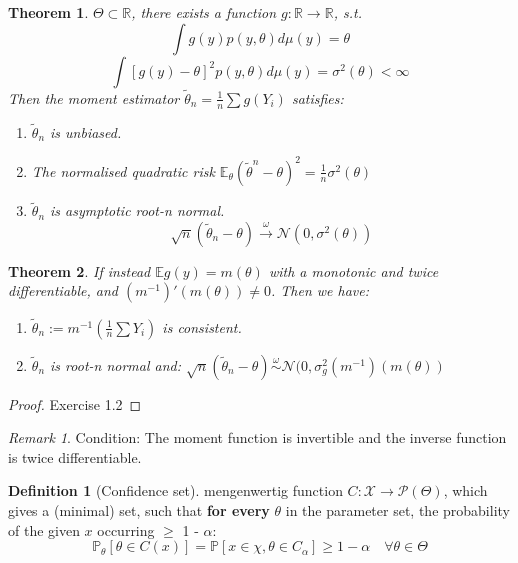 \documentclass[a4paper,12pt, oneside, fleqn]{book}
\newtheorem{theorem}{Theorem}[section]
\theoremstyle{definition}
\newtheorem{definition}{Definition}[section]
\theoremstyle{remark}
\newtheorem*{remark}{Remark}
\begin{document}
\begin{theorem}
	$\Theta \subset \mathbb{R}$, there exists a function $g: \mathbb{R} \longrightarrow \mathbb{R}$, s.t.
	\begin{equation*}
		\int g(y) p(y,\theta) d\mu(y) = \theta
	\end{equation*}
	\begin{equation*}
		\int [g(y) - \theta]^2 p(y,\theta) d\mu(y) = \sigma^2(\theta) < \infty
	\end{equation*}
	Then the moment estimator $\tilde{\theta}_n = \frac{1}{n} \sum g(Y_i)$ satisfies:
	\begin{enumerate}
		\item $\tilde{\theta}_n$ is unbiased.
		\item The normalised quadratic risk $ \mathbb{E}_\theta (\tilde{\theta}^n - \theta)^2 = \frac{1}{n} \sigma^2(\theta)$
		\item $\tilde{\theta}_n$ is asymptotic root-n normal.
		\begin{equation*}
			\sqrt{n} (\tilde{\theta}_n - \theta) \overset{\omega}{\longrightarrow} \mathcal{N}(0, \sigma^2(\theta))
		\end{equation*}
	\end{enumerate}
\end{theorem}

\begin{theorem}
	If instead $\mathbb{E} g(y) = m(\theta)$ with a monotonic and twice differentiable, and $(m^{-1})'(m(\theta)) \neq 0$. Then we have:
	\begin{enumerate}
		\item $\tilde{\theta}_n := m^{-1}(\frac{1}{n} \sum Y_i )$ is consistent.
		\item $\tilde{\theta}_n$ is root-n normal and: $\sqrt{n} (\tilde{\theta}_n - \theta) \overset{\omega}{\sim} \mathcal{N}(0, \sigma^2_g (m^{-1})(m(\theta))$
	\end{enumerate}
\end{theorem}

\begin{proof}
	Exercise 1.2
\end{proof}

\begin{remark}
Condition: The moment function is invertible and the inverse function is twice differentiable.	
\end{remark}


\begin{definition}[Confidence set]
mengenwertig function  \( C : \mathcal{X} \longrightarrow \mathcal{P}(\Theta) \), which gives a (minimal) set, such that\textbf{ for every} $\theta$ in the parameter set, the probability of the given $x$ occurring $\geq$ 1 - $\alpha$:
\begin{equation}
    \mathbb{P}_{\theta}[\theta \in C(x)] = \mathbb{P} [x \in \chi, \theta \in C_\alpha] \geq 1 - \alpha \quad \forall \theta \in \Theta
\end{equation}
\end{definition}
\end{document}
